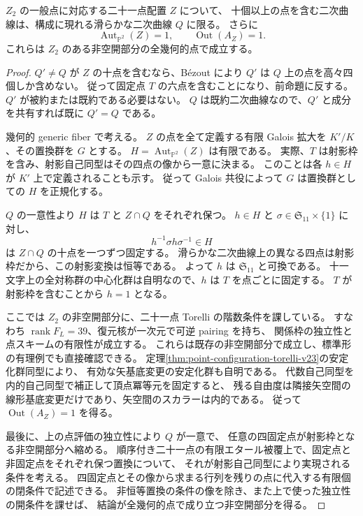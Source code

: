 \begin{theorem}[二次曲線の一意性と自己同型の消滅]
\label{thm:Z2-outer-trivial-v25}
$Z_2$ の一般点に対応する二十一点配置 $Z$ について、
十個以上の点を含む二次曲線は、構成に現れる滑らかな二次曲線 $Q$ に限る。
さらに
\[
 \operatorname{Aut}_{\mathbb P^2}(Z)=1,\qquad
 \operatorname{Out}(A_Z)=1.
\]
これらは $Z_2$ のある非空開部分の全幾何的点で成立する。
\end{theorem}
\begin{proof}
$Q'\ne Q$ が $Z$ の十点を含むなら、B\'ezout により
$Q'$ は $Q$ 上の点を高々四個しか含めない。
従って固定点 $T$ の六点を含むことになり、前命題に反する。
$Q'$ が被約または既約である必要はない。
$Q$ は既約二次曲線なので、$Q'$ と成分を共有すれば既に $Q'=Q$ である。

幾何的 generic fiber で考える。
$Z$ の点を全て定義する有限 Galois 拡大を $K'/K$、その置換群を $G$ とする。
$H=\operatorname{Aut}_{\mathbb P^2}(Z)$ は有限である。
実際、$T$ は射影枠を含み、射影自己同型はその四点の像から一意に決まる。
このことは各 $h\in H$ が $K'$ 上で定義されることも示す。
従って Galois 共役によって $G$ は置換群としての $H$ を正規化する。

$Q$ の一意性より $H$ は $T$ と $Z\cap Q$ をそれぞれ保つ。
$h\in H$ と $\sigma\in\mathfrak S_{11}\times\{1\}$ に対し、
\[
 h^{-1}\sigma h\sigma^{-1}\in H
\]
は $Z\cap Q$ の十点を一つずつ固定する。
滑らかな二次曲線上の異なる四点は射影枠だから、この射影変換は恒等である。
よって $h$ は $\mathfrak S_{11}$ と可換である。
十一文字上の全対称群の中心化群は自明なので、$h$ は $T$ を点ごとに固定する。
$T$ が射影枠を含むことから $h=1$ となる。

ここでは $Z_2$ の非空開部分に、二十一点 Torelli の階数条件を課している。
すなわち $\operatorname{rank}F_L=39$、復元核が一次元で可逆 pairing を持ち、
関係枠の独立性と点スキームの有限性が成立する。
これらは既存の非空開部分で成立し、標準形の有理例でも直接確認できる。
定理\ref{thm:point-configuration-torelli-v23}の安定化群同型により、
有効な矢基底変更の安定化群も自明である。
代数自己同型を内的自己同型で補正して頂点冪等元を固定すると、
残る自由度は隣接矢空間の線形基底変更だけであり、矢空間のスカラーは内的である。
従って $\operatorname{Out}(A_Z)=1$ を得る。

最後に、上の点評価の独立性により $Q$ が一意で、
任意の四固定点が射影枠となる非空開部分へ縮める。
順序付き二十一点の有限エタール被覆上で、固定点と非固定点をそれぞれ保つ置換について、
それが射影自己同型により実現される条件を考える。
四固定点とその像から求まる行列を残りの点に代入する有限個の閉条件で記述できる。
非恒等置換の条件の像を除き、また上で使った独立性の開条件を課せば、
結論が全幾何的点で成り立つ非空開部分を得る。
\end{proof}

